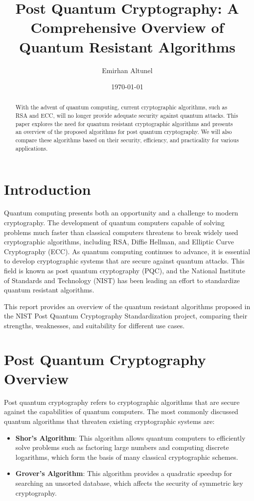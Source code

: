 \documentclass[a4paper,12pt]{article}
\title{Post Quantum Cryptography: A Comprehensive Overview of Quantum Resistant Algorithms}
\author{Emirhan Altunel}
\date{\today}
\begin{document}
\maketitle

\begin{abstract}
    With the advent of quantum computing, current cryptographic algorithms, such as RSA and ECC, will no longer provide adequate security against quantum attacks. This paper explores the need for quantum resistant cryptographic algorithms and presents an overview of the proposed algorithms for post quantum cryptography. We will also compare these algorithms based on their security, efficiency, and practicality for various applications.
\end{abstract}

\newpage

\tableofcontents

\newpage

\section{Introduction}
Quantum computing presents both an opportunity and a challenge to modern cryptography. The development of quantum computers capable of solving problems much faster than classical computers threatens to break widely used cryptographic algorithms, including RSA, Diffie Hellman, and Elliptic Curve Cryptography (ECC). As quantum computing continues to advance, it is essential to develop cryptographic systems that are secure against quantum attacks. This field is known as post quantum cryptography (PQC), and the National Institute of Standards and Technology (NIST) has been leading an effort to standardize quantum resistant algorithms.

This report provides an overview of the quantum resistant algorithms proposed in the NIST Post Quantum Cryptography Standardization project, comparing their strengths, weaknesses, and suitability for different use cases.

\section{Post Quantum Cryptography Overview}
Post quantum cryptography refers to cryptographic algorithms that are secure against the capabilities of quantum computers. The most commonly discussed quantum algorithms that threaten existing cryptographic systems are:
\begin{itemize}
    \item \textbf{Shor's Algorithm}: This algorithm allows quantum computers to efficiently solve problems such as factoring large numbers and computing discrete logarithms, which form the basis of many classical cryptographic schemes.
    \item \textbf{Grover's Algorithm}: This algorithm provides a quadratic speedup for searching an unsorted database, which affects the security of symmetric key cryptography.
\end{itemize}
\end{document}

